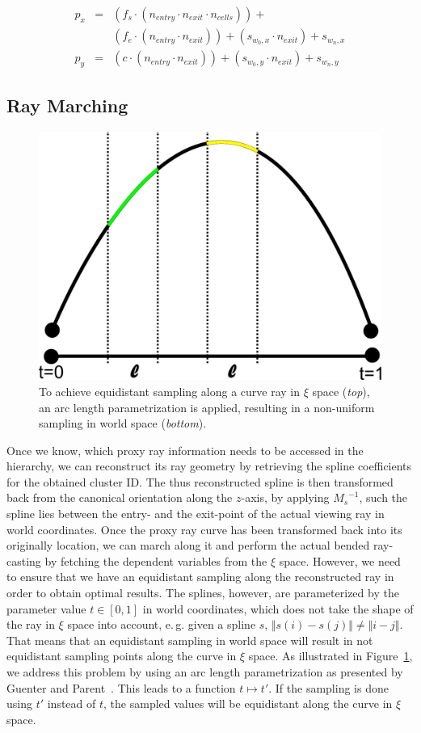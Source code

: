 \documentclass[review,journal]{vgtc}         %
\begin{document}
\begin{eqnarray*}
p_x & = &(f_s \cdot (n_{entry} \cdot n_{exit} \cdot n_{cells})) + \\
	&  &(f_e \cdot (n_{entry} \cdot n_{exit})) + (s_{w_0,x} \cdot n_{exit}) + s_{w_n,x}\\
p_y & = &(c   \cdot (n_{entry} \cdot n_{exit})) + (s_{w_0,y} \cdot n_{exit}) + s_{w_n,y}
\end{eqnarray*}

\subsection{Ray Marching}

\begin{figure}[b]
\centering
\includegraphics[width=0.5\linewidth]{figures/arclength}
\caption{To achieve equidistant sampling along a curve ray in $\xi$ space ({\it top}), an arc length parametrization is applied, resulting in a non-uniform sampling in world space ({\it bottom}).}
\label{fig:arclength}
\end{figure}

Once we know, which proxy ray information needs to be accessed in the hierarchy, we can reconstruct its ray geometry by retrieving the spline coefficients for the obtained cluster ID. The thus reconstructed spline is then transformed back from the canonical orientation along the $z$-axis, by applying ${M_s}^{-1}$, such the spline lies between the entry- and the exit-point of the actual viewing ray in world coordinates. Once the proxy ray curve has been transformed back into its originally location, we can march along it and perform the actual bended ray-casting by fetching the dependent variables from the $\xi$ space. However, we need to ensure that we have an equidistant sampling along the reconstructed ray in order to obtain optimal results. The splines, however, are parameterized by the parameter value $t \in [0,1]$ in world coordinates, which does not take the shape of the ray in $\xi$ space into account, e.\,g. given a spline $s$, $\Vert s(i) - s(j) \Vert \neq \Vert i - j \Vert$. That means that an equidistant sampling in world space will result in not equidistant sampling points along the curve in $\xi$ space. As illustrated in Figure~\ref{fig:arclength}, we address this problem by using an arc length parametrization as presented by Guenter and Parent~\cite{guenter90arclength}. This leads to a function $t \mapsto t'$. If the sampling is done using $t'$ instead of $t$, the sampled values will be equidistant along the curve in $\xi$ space.
\end{document}
